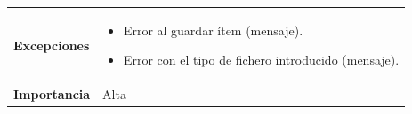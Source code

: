 \documentclass[
]{article}
\providecommand{\tightlist}{%
  \setlength{\itemsep}{0pt}\setlength{\parskip}{0pt}}
\begin{document}
\begin{longtable}[]{@{}ll@{}}
\begin{minipage}[t]{0.15\columnwidth}
\textbf{Excepciones}\strut
\end{minipage} & \begin{minipage}[t]{0.79\columnwidth}\raggedright
\begin{itemize}
\tightlist
\item
  Error al guardar ítem (mensaje).
\item
  Error con el tipo de fichero introducido (mensaje).
\end{itemize}\strut
\end{minipage}\tabularnewline
\begin{minipage}[t]{0.15\columnwidth}\raggedright
\textbf{Importancia}\strut
\end{minipage} & \begin{minipage}[t]{0.79\columnwidth}\raggedright
Alta\strut
\end{minipage}\tabularnewline
\bottomrule
\end{longtable}
\end{document}
